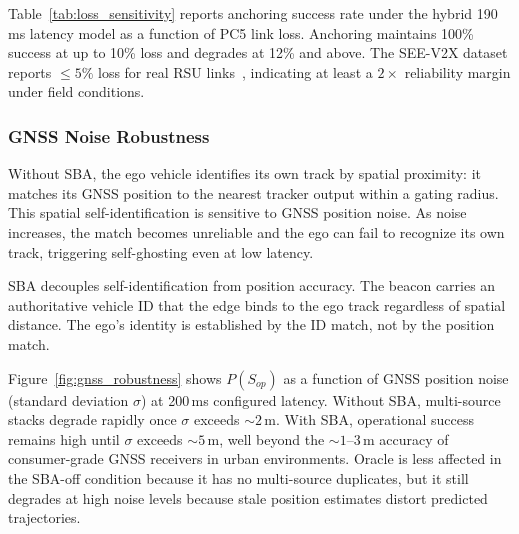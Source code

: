 Table~\ref{tab:loss_sensitivity} reports anchoring success rate under the hybrid 190\,ms latency model as a function of PC5 link loss. Anchoring maintains 100\% success at up to 10\% loss and degrades at 12\% and above. The SEE-V2X dataset reports $\leq 5\%$ loss for real RSU links~\cite{seev2x}, indicating at least a $2\times$ reliability margin under field conditions.



\subsubsection{GNSS Noise Robustness}
\label{sec:eval:gnss}

Without SBA, the ego vehicle identifies its own track by spatial proximity: it matches its GNSS position to the nearest tracker output within a gating radius. This spatial self-identification is sensitive to GNSS position noise. As noise increases, the match becomes unreliable and the ego can fail to recognize its own track, triggering self-ghosting even at low latency.

SBA decouples self-identification from position accuracy. The beacon carries an authoritative vehicle ID that the edge binds to the ego track regardless of spatial distance. The ego's identity is established by the ID match, not by the position match.

Figure~\ref{fig:gnss_robustness} shows $P(S_{op})$ as a function of GNSS position noise (standard deviation $\sigma$) at 200\,ms configured latency. Without SBA, multi-source stacks degrade rapidly once $\sigma$ exceeds ${\sim}2\,\mathrm{m}$. With SBA, operational success remains high until $\sigma$ exceeds ${\sim}5\,\mathrm{m}$, well beyond the ${\sim}1\text{--}3\,\mathrm{m}$ accuracy of consumer-grade GNSS receivers in urban environments. Oracle is less affected in the SBA-off condition because it has no multi-source duplicates, but it still degrades at high noise levels because stale position estimates distort predicted trajectories.


